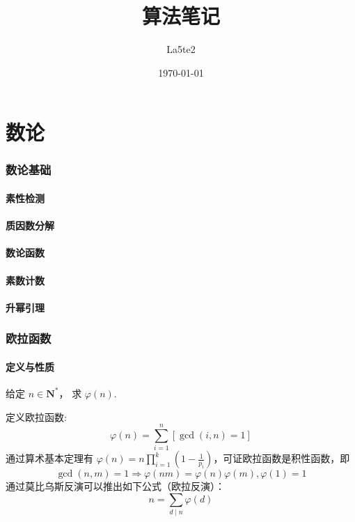 \documentclass[12pt,a4paper]{article}
\title{算法笔记}
\author{La5te2}
\date{\today}
\begin{document}
	
\maketitle
\setcounter{tocdepth}{2}
\tableofcontents
\makeatletter
{} %
\makeatother
\graphicspath{{image/}}


\newpage
\part{数论}
\section{数论基础}
\subsection{素性检测}
\subsection{质因数分解}
\subsection{数论函数}
\subsection{素数计数} %
\subsection{升幂引理}

\newpage
\section{欧拉函数}
\subsection{定义与性质}
\begin{mdframed}[leftline=true, linewidth=2pt, linecolor=gray]
	给定 $n\in \mathbf{N^*}$， 求 $\varphi(n)$.
\end{mdframed}
定义欧拉函数: \begin{equation*}\displaystyle\varphi(n)=\sum_{i=1}^{n}[\gcd(i,n)=1]\end{equation*}
通过算术基本定理有 $\displaystyle \varphi(n)=n\prod^{k}_{i=1}(1-\frac{1}{p_i})$，可证欧拉函数是积性函数，即
\begin{equation*}
	\gcd(n,m)=1\Rightarrow \varphi(nm)=\varphi(n)\varphi(m),\varphi(1)=1
\end{equation*}
通过莫比乌斯反演可以推出如下公式（欧拉反演）：
\begin{equation*}
	n=\sum_{d\mid n}\varphi(d)
\end{equation*}
\end{document}
